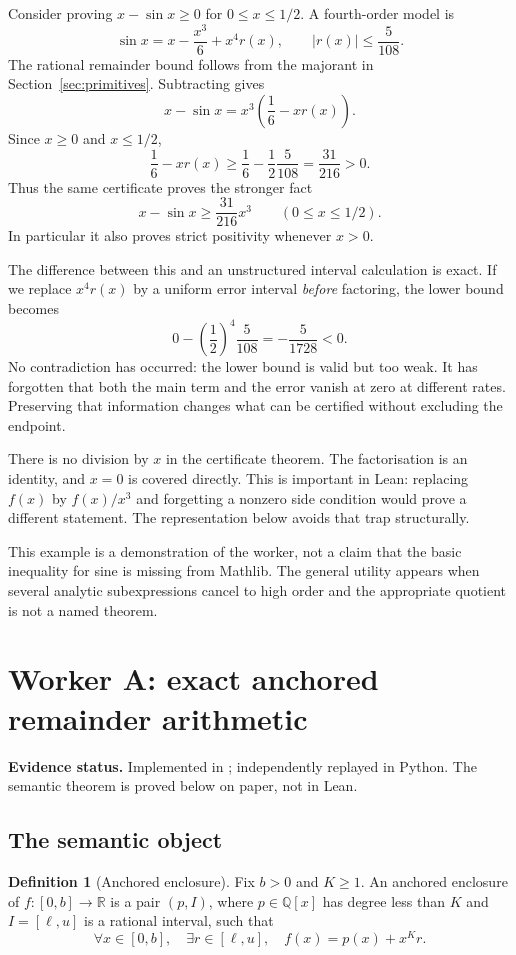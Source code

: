 \documentclass[11pt,a4paper]{article}
\theoremstyle{definition}\newtheorem{definition}[theorem]{Definition}
\newcommand{\R}{\mathbb R}\newcommand{\Q}{\mathbb Q}\newcommand{\N}{\mathbb N}
\newcommand{\code}[1]{\texttt{\detokenize{#1}}}
\newcommand{\status}[1]{\par\noindent\textbf{Evidence status.} #1\par}
\begin{document}
Consider proving $x-\sin x\ge0$ for $0\le x\le1/2$. A fourth-order model is
\[
 \sin x=x-\frac{x^3}{6}+x^4r(x),\qquad |r(x)|\le\frac5{108}.
\]
The rational remainder bound follows from the majorant in
Section~\ref{sec:primitives}. Subtracting gives
\[
 x-\sin x=x^3\left(\frac16-xr(x)\right).
\]
Since $x\ge0$ and $x\le1/2$,
\[
 \frac16-xr(x)\ge\frac16-\frac12\frac5{108}=\frac{31}{216}>0.
\]
Thus the same certificate proves the stronger fact
\begin{equation}\label{eq:sine-output}
 x-\sin x\ge\frac{31}{216}x^3\qquad(0\le x\le1/2).
\end{equation}
In particular it also proves strict positivity whenever $x>0$.

The difference between this and an unstructured interval calculation is exact.
If we replace $x^4r(x)$ by a uniform error interval \emph{before} factoring, the
lower bound becomes
\[
 0-\left(\frac12\right)^4\frac5{108}=-\frac5{1728}<0.
\]
No contradiction has occurred: the lower bound is valid but too weak. It has
forgotten that both the main term and the error vanish at zero at different
rates. Preserving that information changes what can be certified without
excluding the endpoint.

There is no division by $x$ in the certificate theorem. The factorisation is an
identity, and $x=0$ is covered directly. This is important in Lean: replacing
$f(x)$ by $f(x)/x^3$ and forgetting a nonzero side condition would prove a
different statement. The representation below avoids that trap structurally.

This example is a demonstration of the worker, not a claim that the basic
inequality for sine is missing from Mathlib. The general utility appears when
several analytic subexpressions cancel to high order and the appropriate
quotient is not a named theorem.

\section{Worker A: exact anchored remainder arithmetic}
\label{sec:anchor}
\status{Implemented in \code{jets.py}; independently replayed in Python.
The semantic theorem is proved below on paper, not in Lean.}

\subsection{The semantic object}

\begin{definition}[Anchored enclosure]
Fix $b>0$ and $K\ge1$. An anchored enclosure of $f:[0,b]\to\R$ is a pair
$(p,I)$, where $p\in\Q[x]$ has degree less than $K$ and $I=[\ell,u]$ is a
rational interval, such that
\begin{equation}\label{eq:anchorsem}
 \forall x\in[0,b],\quad \exists r\in[\ell,u],\quad
 f(x)=p(x)+x^Kr.
\end{equation}
\end{definition}
\end{document}
